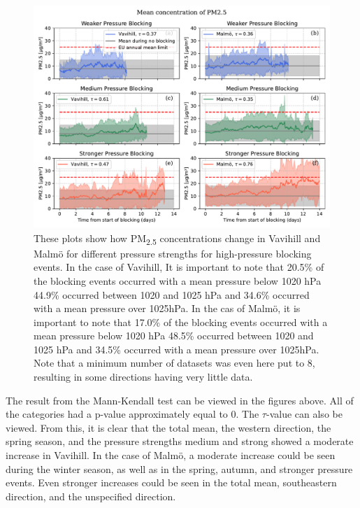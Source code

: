 \begin{figure}[H]
    \centering
    \includegraphics[width=\textwidth]{Figures/Meanplot_pressure.pdf}
    \caption{These plots show how PM\textsubscript{2.5} concentrations change in Vavihill and Malmö for different pressure strengths for high-pressure blocking events. In the case of Vavihill, It is important to note that 20.5\% of the blocking events occurred with a mean pressure below 1020 hPa 44.9\% occurred between 1020 and 1025 hPa and 34.6\% occurred with a mean pressure over 1025hPa. In the cas of Malmö, it is important to note that 17.0\% of the blocking events occurred with a mean pressure below 1020 hPa 48.5\% occurred between 1020 and 1025 hPa and 34.5\% occurred with a mean pressure over 1025hPa. Note that a minimum number of datasets was even here put to 8, resulting in some directions having very little data.}
    \label{fig:Meanplot_pressure}
\end{figure}

The result from the Mann-Kendall test can be viewed in the figures above. All of the categories had a p-value approximately equal to 0. The $\tau$-value can also be viewed. From this, it is clear that the total mean, the western direction, the spring season, and the pressure strengths medium and strong showed a moderate increase in Vavihill. In the case of Malmö, a moderate increase could be seen during the winter season, as well as in the spring, autumn, and stronger pressure events. Even stronger increases could be seen in the total mean, southeastern direction, and the unspecified direction.




